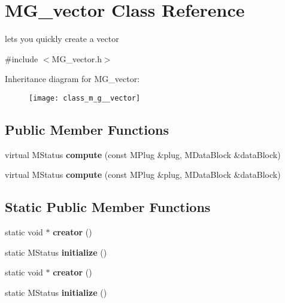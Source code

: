 \hypertarget{class_m_g__vector}{\section{M\-G\-\_\-vector Class Reference}
\label{class_m_g__vector}
}


lets you quickly create a vector  




{\ttfamily \#include $<$M\-G\-\_\-vector.\-h$>$}

Inheritance diagram for M\-G\-\_\-vector\-:\begin{figure}[H]
\begin{center}
\leavevmode
\texttt{[image: class\_m\_g\_\_vector]}
\end{center}
\end{figure}
\subsection*{Public Member Functions}
\begin{DoxyCompactItemize}
\item 
\hypertarget{class_m_g__vector_a8da2ac463306acc395900f2b5d2402d7}{virtual M\-Status {\bfseries compute} (const M\-Plug \&plug, M\-Data\-Block \&data\-Block)}\label{class_m_g__vector_a8da2ac463306acc395900f2b5d2402d7}

\item 
\hypertarget{class_m_g__vector_a8da2ac463306acc395900f2b5d2402d7}{virtual M\-Status {\bfseries compute} (const M\-Plug \&plug, M\-Data\-Block \&data\-Block)}\label{class_m_g__vector_a8da2ac463306acc395900f2b5d2402d7}

\end{DoxyCompactItemize}
\subsection*{Static Public Member Functions}
\begin{DoxyCompactItemize}
\item 
\hypertarget{class_m_g__vector_a4a84b7bfa0e06ce993b8b03d9a95c50c}{static void $\ast$ {\bfseries creator} ()}\label{class_m_g__vector_a4a84b7bfa0e06ce993b8b03d9a95c50c}

\item 
\hypertarget{class_m_g__vector_ab2703616d4245176896a792964f28982}{static M\-Status {\bfseries initialize} ()}\label{class_m_g__vector_ab2703616d4245176896a792964f28982}

\item 
\hypertarget{class_m_g__vector_a4a84b7bfa0e06ce993b8b03d9a95c50c}{static void $\ast$ {\bfseries creator} ()}\label{class_m_g__vector_a4a84b7bfa0e06ce993b8b03d9a95c50c}

\item 
\hypertarget{class_m_g__vector_ab2703616d4245176896a792964f28982}{static M\-Status {\bfseries initialize} ()}\label{class_m_g__vector_ab2703616d4245176896a792964f28982}

\end{DoxyCompactItemize}
